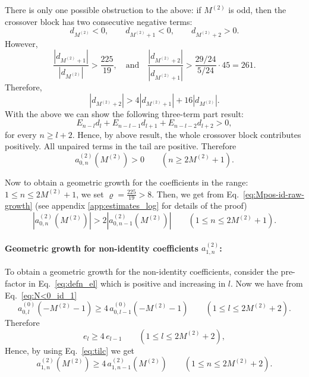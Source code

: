 \documentclass[11pt]{article}
\newcommand\be{\begin{equation}}
\newcommand\ee{\end{equation}}
\begin{document}
There is only one possible obstruction to the above: if \(M^{(2)}\) is odd, then the crossover block has two consecutive negative terms:
\[
        d_{M^{(2)}}<0,\qquad d_{M^{(2)}+1}<0,\qquad d_{M^{(2)}+2}>0.
\]
However,
\[
        \frac{|d_{M^{(2)}+1}|}{|d_{M^{(2)}}|}
        >
        \frac{225}{19}, \quad \text{and} \quad \frac{|d_{M^{(2)}+2}|}{|d_{M^{(2)}+1}|}
        >
        \frac{29/24}{5/24}\cdot45
        =
        261.
\]
Therefore,
\[
        |d_{M^{(2)}+2}|
        >
        4|d_{M^{(2)}+1}|+16|d_{M^{(2)}}|.
\]
With the above we can show the following three-term part result:
\be\label{eq:xjE5}
        E_{n-l}d_l + E_{n-l-1}d_{l+1} + E_{n-l-2}d_{l+2}>0,
\ee
for every $n\geq l+2$. Hence, by above result, the whole crossover block contributes positively. All unpaired terms in the tail are positive. Therefore
\[
        a^{(2)}_{0,n}(M^{(2)})>0
        \qquad(n\ge2M^{(2)}+1).
\]

Now to obtain a geometric growth for the coefficients in the range: $1\le n\le2M^{(2)}+1$, we set $\varrho = \frac{225}{19}>8$. Then, we get from Eq.~\eqref{eq:Mpos-id-raw-growth} (see appendix \ref{app:estimates_log} for details of the proof)
\begin{equation}
        \left|a^{(2)}_{0,n}(M^{(2)})\right|
        >
        2\left|a^{(2)}_{0,n-1}(M^{(2)})\right|
        \qquad(1\le n\le2M^{(2)}+1).
\label{eq:Mpos-id-supergrowtha}
\end{equation}

\paragraph{Geometric growth for non-identity coefficients $a_{1,n}^{(2)}$:}
To obtain a geometric growth for the non-identity coefficients, consider the pre-factor in Eq.~\eqref{eq:defn_el} which is positive and increasing in \(l\). Now we have from Eq.~\eqref{eq:N<0_id_1}
\[
        a^{(0)}_{0,l}(-M^{(2)}-1)
        \ge
        4\,a^{(0)}_{0,l-1}(-M^{(2)}-1)
        \qquad(1\le l\le2M^{(2)}+2).
\]
Therefore
\be\label{eq:assump_el}
        e_l\ge 4 \, e_{l-1}
        \qquad(1\le l\le2M^{(2)}+2),
\ee
Hence, by using Eq.~\eqref{eq:tilc} we get
\be\label{eq:Mpos-nonid-supergrowtha}
        a^{(2)}_{1,n}(M^{(2)})
        \ge
        4\,a^{(2)}_{1,n-1}(M^{(2)})
        \qquad(1\le n\le2M^{(2)}+2).
\ee



\end{document}
